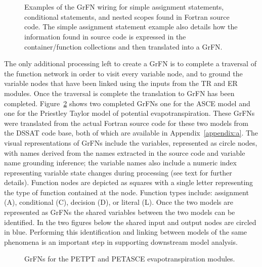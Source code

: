 \FloatBarrier
\begin{figure}[!htbp]
  \centering
  \\
  \\
  \caption[Source Code to GrFN Wiring Examples]{Examples of the GrFN wiring for simple assignment statements, conditional statements, and nested scopes found in Fortran source code. The simple assignment statement example also details how the information found in source code is expressed in the container/function collections and then translated into a GrFN.}
  \label{fig:statement_wiring}
\end{figure}
\FloatBarrier

The only additional processing left to create a GrFN is to complete a traversal of the function network in order to visit every variable node, and to ground the variable nodes that have been linked using the inputs from the TR and ER modules.
Once the traversal is complete the translation to GrFN has been completed.
Figure~\ref{fig:grfn_cgs} shows two completed GrFNs one for the ASCE model and one for the Priestley Taylor model of potential evapotranspiration.
These GrFNs were translated from the actual Fortran source code for these two models from the DSSAT code base, both of which are available in Appendix~\ref{appendix:a}.
The visual representations of GrFNs include the variables, represented as circle nodes, with names derived from the names extracted in the source code and variable name grounding inference; the variable names also include a numeric index representing variable state changes during processing (see text for further details).
Function nodes are depicted as squares with a single letter representing the type of function contained at the node.
Function types include: assignment (A), conditional (C), decision (D), or literal (L).
Once the two models are represented as GrFNs the shared variables between the two models can be identified.
In the two figures below the shared input and output nodes are circled in blue.
Performing this identification and linking between models of the same phenomena is an important step in supporting downstream model analysis.

\FloatBarrier
\begin{figure}[!htbp]
  \centering
  \hfill
  \caption[Evapo-transpiration GrFN Examples]{GrFNs for the PETPT and PETASCE evapotranspiration modules.}
  \label{fig:grfn_cgs}
\end{figure}
\FloatBarrier

